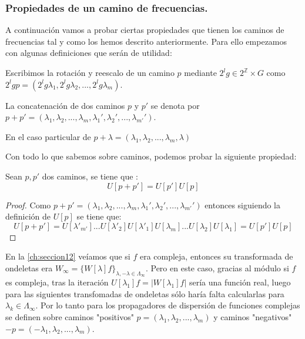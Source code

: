 \subsubsection{Propiedades de un camino de frecuencias.}

\noindent A continuación vamos a probar ciertas propiedades que tienen los caminos de frecuencias tal y como los hemos descrito anteriormente. Para ello empezamos con algunas definiciones que serán de utilidad:

\begin{definicion}
Escribimos la rotación y reescalo de un camino $p$ mediante $2^lg \in 2^\mathbb{Z}\times G$ como $2^lgp=(2^lg\lambda_1,2^lg\lambda_2,...,2^lg\lambda_m)$.
\end{definicion}

\begin{definicion}
La concatenación de dos caminos $p$ y $p'$ se denota por $p+p'=(\lambda_1,\lambda_2,...,\lambda_m,\lambda_1',\lambda_2',...,\lambda_{m'}')$. 

En el caso particular de $p+\lambda=(\lambda_1,\lambda_2,...,\lambda_m,\lambda)$
\end{definicion}

\noindent Con todo lo que sabemos sobre caminos, podemos probar la siguiente propiedad: 

\begin{proposicion} \label{proposicionSumaCaminos}
Sean $p, p'$ dos caminos, se tiene que :
$$U[p+p']=U[p']U[p]$$
\end{proposicion}

\begin{proof}
Como $p+p'=(\lambda_1,\lambda_2,...,\lambda_m,\lambda_1',\lambda_2',...,\lambda_{m'}')$ entonces siguiendo la definición de $U[p]$ se tiene que: 
$$U[p+p']=U[\lambda'_{m'}]...U[\lambda'_2]U[\lambda'_1]U[\lambda_{m}]...U[\lambda_2]U[\lambda_1]=U[p']U[p]$$ \qedhere
\end{proof}

\medskip

\noindent En la \autoref{ch:seccion12} veíamos que si $f$ era compleja, entonces su transformada de ondeletas era $ W_\infty=\lbrace W[\lambda]f \rbrace_{\lambda , -\lambda  \in \Lambda_{\infty} }$. Pero en este caso, gracias al módulo si $f$ es compleja, tras la iteración $U[\lambda_1]f=\left|W[\lambda_1]f\right|$ sería una función real, luego para las siguientes transfomadas de ondeletas sólo haría falta calcularlas para $\lambda_k \in \Lambda_\infty$. Por lo tanto para los propagadores de dispersión de funciones complejas se definen sobre caminos "positivos" $p=(\lambda_1,\lambda_2, ... , \lambda_m)$ y caminos "negativos" $-p=(-\lambda_1,\lambda_2, ... , \lambda_m)$.

